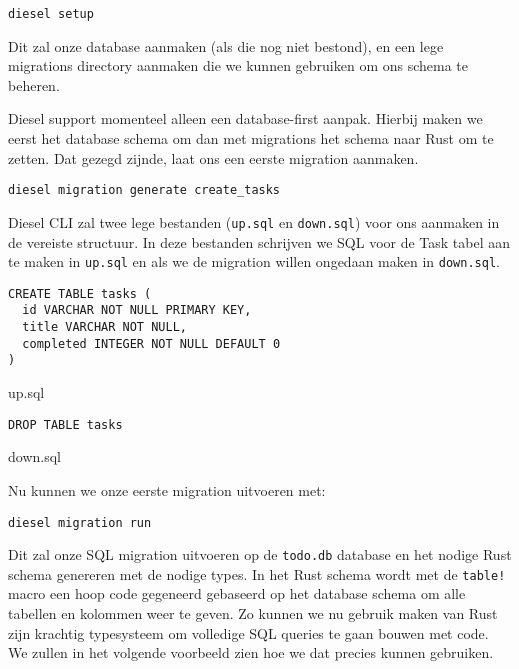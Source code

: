 \begin{verbatim}
diesel setup
\end{verbatim}

Dit zal onze database aanmaken (als die nog niet bestond), en een lege migrations directory aanmaken
die we kunnen gebruiken om ons schema te beheren.

Diesel support momenteel alleen een database-first aanpak. Hierbij maken we eerst het database
schema om dan met migrations het schema naar Rust om te zetten. Dat gezegd zijnde, laat ons een
eerste migration aanmaken.

\begin{verbatim}
diesel migration generate create_tasks
\end{verbatim}

Diesel CLI zal twee lege bestanden (\texttt{up.sql} en \texttt{down.sql}) voor
ons aanmaken in de vereiste structuur. In deze bestanden schrijven we SQL voor de Task tabel aan te
maken in \texttt{up.sql} en als we de migration willen ongedaan maken in
\texttt{down.sql}.

\begin{listing}
\begin{verbatim}
CREATE TABLE tasks (
  id VARCHAR NOT NULL PRIMARY KEY,
  title VARCHAR NOT NULL,
  completed INTEGER NOT NULL DEFAULT 0
)
\end{verbatim}
\caption{up.sql}
\end{listing}

\begin{listing}
\begin{verbatim}
DROP TABLE tasks
\end{verbatim}
\caption{down.sql}
\end{listing}

Nu kunnen we onze eerste migration uitvoeren met:

\begin{verbatim}
diesel migration run
\end{verbatim}

Dit zal onze SQL migration uitvoeren op de \texttt{todo.db} database en het nodige Rust
schema genereren met de nodige types. In het Rust schema wordt met de \texttt{table!}
macro een hoop code gegeneerd gebaseerd op het database schema om alle tabellen en kolommen weer te
geven. Zo kunnen we nu gebruik maken van Rust zijn krachtig typesysteem om volledige SQL queries te
gaan bouwen met code. We zullen in het volgende voorbeeld zien hoe we dat precies kunnen gebruiken.

